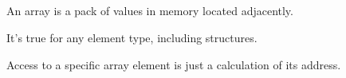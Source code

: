 ﻿\subsection{\Conclusion{}}


An array is a pack of values in memory located adjacently.

It's true for any element type, including structures.

Access to a specific array element is just a calculation of its address.

